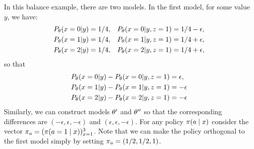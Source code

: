\begin{example}
  In this balance example, there are two models. In the first model, for some value $y$, we have:
  \begin{align}
    P_{\theta}(x=0|y) &= 1/4, &
                                P_{\theta}(x=0|y,z=1) &= 1/4 - \epsilon, \\
    P_{\theta}(x=1|y) &= 1/4, &
                                P_{\theta}(x=1|y,z=1) &= 1/4 + \epsilon, \\
    P_{\theta}(x=2|y) &= 1/4, &
                                P_{\theta}(x=2|y,z=1) &= 1/4 + \epsilon, \\
  \end{align}
  so that
  \begin{align}
    P_{\theta}(x=0|y) -  P_{\theta}(x=0|y,z=1) &= \epsilon, \\
    P_{\theta}(x=1|y) - P_{\theta}(x=1|y,z=1) &=  - \epsilon\\
    P_{\theta}(x=2|y) - P_{\theta}(x=2|y,z=1) &=  - \epsilon
  \end{align}
  Similarly, we can construct models $\theta'$ and $\theta''$ so that the corresponding differences are $(-\epsilon, \epsilon, -\epsilon)$ and $(\epsilon, \epsilon, -\epsilon)$.
  For any policy $\pi(a \mid x)$ consider the vector $\pi_a = (\pi(a = 1 \mid x))_{x=1}^3$. Note that we can make the policy orthogonal to the first model simply by setting $\pi_a = (1/2, 1/2, 1)$.
\end{example}

~\\

